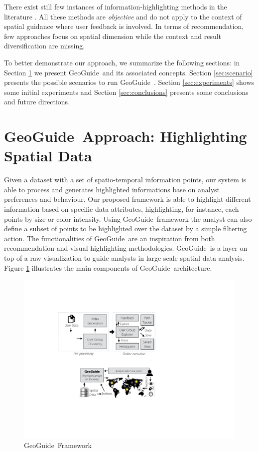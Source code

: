 \documentclass[conference,compsoc]{IEEEtran}
\newcommand{\framework}{{\sc GeoGuide}}
\begin{document}
There exist still few instances of information-highlighting methods in the literature \cite{Liang2010,Robinson2011,wongsuphasawat2016voyager,willett2007scented}. All these methods are {\em objective} and do not apply to the context of spatial guidance where user feedback is involved.  In terms of recommendation, few approaches focus on spatial dimension \cite{Bao2015,Levandoski:2012} while the context and result diversification are missing.

To better demonstrate our approach, we summarize the following sections: in Section \ref{sec:pb}  we present \framework\, and its associated concepts. Section \ref{sec:scenario}  presents the possible scenarios to run \framework\ . Section  \ref{sec:experiments}  shows some initial experiments and Section \ref{sec:conclusions}  presents some conclusions and future directions. 


\section{\framework\ Approach: Highlighting Spatial Data}
\label{sec:pb}

Given a dataset with a set of spatio-temporal information points, our system is able to process and generates highlighted informations base on analyst preferences and behaviour. Our proposed framework is able to highlight different information based on specific data attributes, highlighting, for instance, each points by size or color intensity. Using \framework\ framework the analyst can also define a subset of points to be highlighted over the dataset by a simple filtering action. The functionalities of \framework\ are an inspiration from both recommendation \cite{Omidvar-Tehrani:2015} and visual highlighting \cite{Liang2010,Robinson2011} methodologies. \framework\ is a layer on top of a raw visualization to guide analysts in large-scale spatial data analysis. Figure \ref{fig:framework} illustrates the main components of \framework\ architecture.


\begin{figure}[t]
  \centering
  \includegraphics[width=\columnwidth]{figs/framework}
\caption{\framework\ Framework}
\label{fig:framework}
\vspace{-10pt}
\end{figure}
\end{document}
